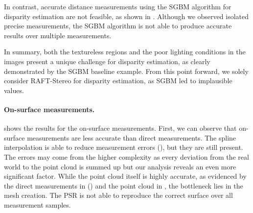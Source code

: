 \documentclass[letterpaper]{article} %
\begin{document}
In contrast, accurate distance measurements using the SGBM algorithm for disparity estimation are not feasible, as shown in . Although we observed isolated precise measurements, the SGBM algorithm is not able to produce accurate results over multiple measurements.

In summary, both the textureless regions and the poor lighting conditions in the images present a unique challenge for disparity estimation, as clearly demonstrated by the SGBM baseline example. From this point forward, we solely consider RAFT-Stereo for disparity estimation, as SGBM led to implausible values.

\begin{table}[ht]
	\centering
	\caption{Comparison of SGBM and RAFT Euclidean measurements with offline and online selection.}
	\label{table:directmeasurements}
\end{table}


\paragraph{On-surface measurements.}  shows the results for the on-surface measurements. First, we can observe that on-surface measurements are less accurate than direct measurements. The spline interpolation is able to reduce measurement errors (), but they are still present. The errors may come from the higher complexity as every deviation from the real world to the point cloud is summed up but our analysis reveals an even more significant factor. While the point cloud itself is highly accurate, as evidenced by the direct measurements in () and the point cloud in , the bottleneck lies in the mesh creation. The PSR is not able to reproduce the correct surface over all measurement samples.
\end{document}
